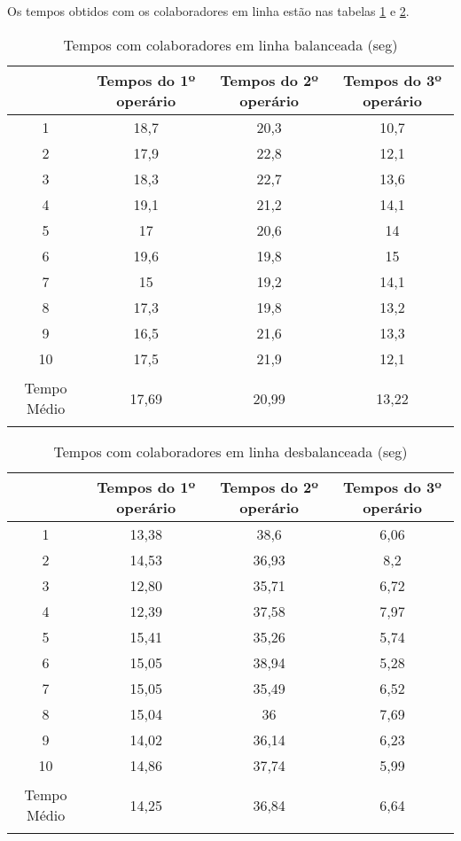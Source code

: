 \documentclass[
	12pt,				%
	oneside,			%
	a4paper,			%
	english,			%
	french,				%
	spanish,			%
	brazil,				%
	]{abntex2}
\begin{document}
Os tempos obtidos com os colaboradores em linha estão nas tabelas \ref{tab4} e \ref{tab3}.

\begin{table}[H]
\centering
\caption{Tempos com colaboradores em linha balanceada (seg)}
\begin{tabular}{c|c|c|c}

	&Tempos do 1º operário	&		Tempos do 2º operário		&	Tempos do 3º operário	\\ \hline
1&	18,7	&		20,3	&		10,7		\\ \hline
2&	17,9	&		22,8	&		12,1		\\ \hline
3&	18,3	&		22,7	&		13,6		\\ \hline
4&	19,1	&		21,2	&		14,1		\\ \hline
5&	17		&	20,6		&	14		\\ \hline
6&	19,6	&		19,8	&		15		\\ \hline
7&	15		&	19,2		&	14,1		\\ \hline
8&	17,3	&		19,8	&		13,2		\\ \hline
9	&16,5	&		21,6	&		13,3		\\ \hline
10&	17,5	&		21,9	&		12,1		\\ \hline
Tempo Médio	&17,69		&	20,99		&	13,22		
									

\label{tab4}
\end{tabular}	
\end{table}

\begin{table}[H]
\centering
\caption{Tempos com colaboradores em linha desbalanceada (seg)}
\begin{tabular}{c|c|c|c}

	&Tempos do 1º operário		&	Tempos do 2º operário	&		Tempos do 3º operário		\\ \hline
1&	13,38		&	38,6	&		6,06		\\ \hline
2	&14,53		&	36,93		&	8,2		\\ \hline
3	&12,80		&	35,71	&		6,72		\\ \hline
4	&12,39		&	37,58	&		7,97		\\ \hline
5	&15,41		&	35,26	&		5,74		\\ \hline
6	&15,05		&	38,94	&		5,28 \\ \hline
7	&15,05		&	35,49	&		6,52		\\ \hline
8	&15,04		&	36		&	7,69		\\ \hline
9	&14,02		&	36,14	&		6,23		\\ \hline
10	&14,86		&	37,74	&		5,99		\\ \hline
Tempo Médio&	14,25		&	36,84		&	6,64		
									
\label{tab3}
\end{tabular}	
\end{table}
\end{document}
